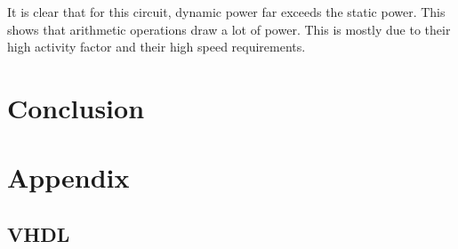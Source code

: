 \documentclass[11pt]{article}
\begin{document}
		It is clear that for this circuit, dynamic power far exceeds the static power. This shows that arithmetic operations draw a lot of power. This is mostly due to their high activity factor and their high speed requirements.  

			

\section{Conclusion}




\section{Appendix}

	\subsection{VHDL}
	
		
		
		
		
		
		
		
		
		
		
		
		
		
		
		
		
		
		
		
		
		
		
\end{document}
